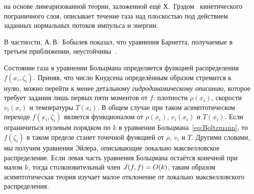 



на основе линеаризованной теории, заложенной ещё Х.~Грэдом~\cite{Grad1963b}
кинетического пограничного слоя, описывает
течение газа над плоскостью под действием заданных нормальных потоков
импульса и энергии.

В частности, А.\,В.~Бобылев показал,
что уравнения Барнетта, получаемые в третьем приближении, неустойчивы~\cite{Bobylev1982}.



Состояние газа в уравнении Больцмана определяется функцией распределения \(f(x_i,\zeta_i)\).
Приняв, что число Кнудсена определённым образом стремится к нулю, можно перейти к менее детальному
\emph{гидродинамическому описанию}, которое требует задания лишь первых пяти моментов от \(f\):
плотности \(\rho(x_i)\), скорости \(v_i(x_i)\) и температуры \(T(x_i)\).
В общем случае при таком асимптотическом переходе \(f(x_i,\zeta_i)\) является функционалом от
\(\rho(x_i)\), \(v_i(x_i)\) и \(T(x_i)\). Если ограничиться нулевым порядком по \(k\)
в уравнении Больцмана~\eqref{eq:Boltzmann}, то \(f(\zeta_i)\) в таком пределе станет точечной
функцией от \(\rho\), \(v_i\) и \(T\). Другими словами, мы получим уравнения Эйлера,
описывающие локально максвелловское распределение.
Если левая часть уравнения Больцмана остаётся конечной при малом \(k\),
тогда столкновительный член \(J(f,f) = O(k)\), таким образом асимптотическая теория
изучает малое отклонение от локально максвелловского распределения.

